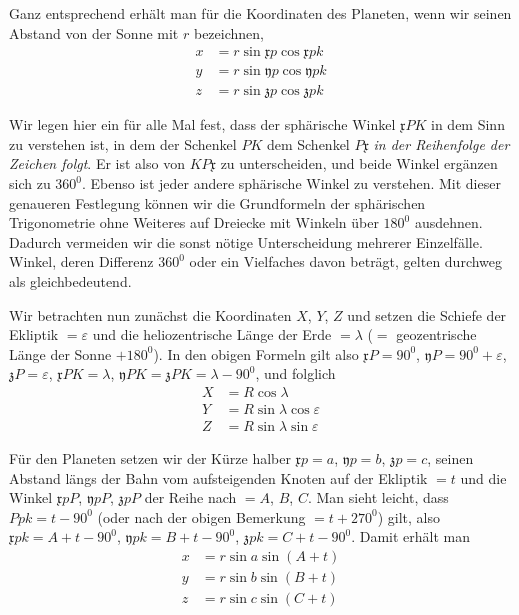 Ganz entsprechend erhält man für die Koordinaten des Planeten, wenn wir
seinen Abstand von der Sonne mit $r$ bezeichnen,
\[
\begin{aligned}
x&=r\sin\mathfrak{x}p\cos\mathfrak{x}pk\\
y&=r\sin\mathfrak{y}p\cos\mathfrak{y}pk\\
z&=r\sin\mathfrak{z}p\cos\mathfrak{z}pk
\end{aligned}
\]

Wir legen hier ein für alle Mal fest, dass der sphärische Winkel
$\mathfrak{x}PK$ in dem Sinn zu verstehen ist, in dem der Schenkel $PK$ dem
Schenkel $P\mathfrak{x}$ \textit{in der Reihenfolge der Zeichen folgt}.
Er ist also von $KP\mathfrak{x}$ zu unterscheiden, und beide Winkel ergänzen
sich zu $360^0$. Ebenso ist jeder andere sphärische Winkel zu verstehen.
Mit dieser genaueren Festlegung können wir die Grundformeln der sphärischen
Trigonometrie ohne Weiteres auf Dreiecke mit Winkeln über $180^0$ ausdehnen.
Dadurch vermeiden wir die sonst nötige Unterscheidung mehrerer Einzelfälle.
Winkel, deren Differenz $360^0$ oder ein Vielfaches davon beträgt, gelten
durchweg als gleichbedeutend.

Wir betrachten nun zunächst die Koordinaten $X$, $Y$, $Z$ und setzen die
Schiefe der Ekliptik $=\varepsilon$ und die heliozentrische Länge der Erde
$=\lambda$ ($=$ geozentrische Länge der Sonne $+180^0$). In den obigen Formeln
gilt also $\mathfrak{x}P=90^0$, $\mathfrak{y}P=90^0+\varepsilon$,
$\mathfrak{z}P=\varepsilon$, $\mathfrak{x}PK=\lambda$,
$\mathfrak{y}PK=\mathfrak{z}PK=\lambda-90^0$, und folglich
%
\[
\begin{aligned}
X&=R\cos\lambda\\
Y&=R\sin\lambda\cos\varepsilon\\
Z&=R\sin\lambda\sin\varepsilon
\end{aligned}
\]

Für den Planeten setzen wir der Kürze halber $\mathfrak{x}p=a$,
$\mathfrak{y}p=b$, $\mathfrak{z}p=c$, seinen Abstand längs der Bahn vom
aufsteigenden Knoten auf der Ekliptik $=t$ und die Winkel $\mathfrak{x}pP$,
$\mathfrak{y}pP$, $\mathfrak{z}pP$ der Reihe nach $=A$, $B$, $C$. Man sieht
leicht, dass $Ppk=t-90^0$ (oder nach der obigen Bemerkung $=t+270^0$) gilt,
also $\mathfrak{x}pk=A+t-90^0$, $\mathfrak{y}pk=B+t-90^0$,
$\mathfrak{z}pk=C+t-90^0$. Damit erhält man
\[
\begin{aligned}
x&=r\sin a\sin(A+t)\\
y&=r\sin b\sin(B+t)\\
z&=r\sin c\sin(C+t)
\end{aligned}
\]

